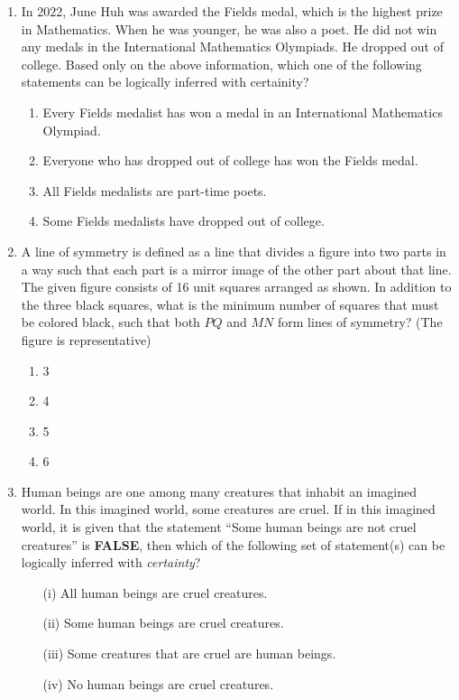 \documentclass[article]{IEEEtran}
\numberwithin{figure}{enumi}
\begin{document}
\begin{enumerate}
 \item In 2022, June Huh was awarded the Fields medal, which is the highest prize in
Mathematics.
When he was younger, he was also a poet. He did not win any medals in the
International Mathematics Olympiads. He dropped out of college.
Based only on the above information, which one of the following statements can be logically inferred with certainity?
\begin{enumerate}
 \item Every Fields medalist has won a medal in an International Mathematics Olympiad.
\item Everyone who has dropped out of college has won the Fields medal.
\item All Fields medalists are part-time poets.
\item Some Fields medalists have dropped out of college.
\end{enumerate}
\item A line of symmetry is defined as a line that divides a figure into two parts in a way such that each part is a mirror image of the other part about that line. \\
The given figure consists of 16 unit squares arranged as shown. In addition to the three black squares, what is the minimum number of squares that must be colored black, such that both $PQ$ and $MN$ form lines of symmetry? (The figure is representative)

\begin{enumerate}
    \item 3
    \item 4
    \item 5
    \item 6
\end{enumerate}
\item Human beings are one among many creatures that inhabit an imagined world. In this imagined world, some creatures are cruel. If in this imagined world, it is given that the statement ``Some human beings are not cruel creatures'' is \textbf{FALSE}, then which of the following set of statement(s) can be logically inferred with \textit{certainty}?
  \begin{enumerate}
    \item[(i)] All human beings are cruel creatures.
    \item[(ii)] Some human beings are cruel creatures.
    \item[(iii)] Some creatures that are cruel are human beings.
    \item[(iv)] No human beings are cruel creatures.
  \end{enumerate}


\end{enumerate}
\end{document}
